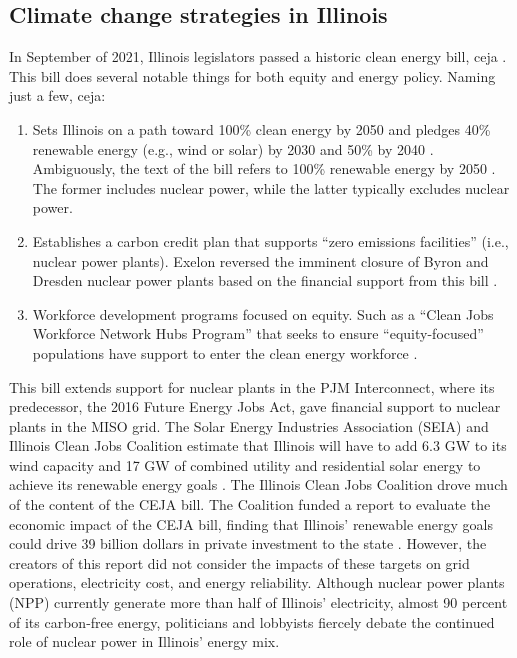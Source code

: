 \subsection{Climate change strategies in Illinois}
\label{section:ceja}
In September of 2021, Illinois legislators passed a historic clean energy bill,
\gls{ceja} \cite{harmon_climate_2021}. This bill does several notable things for
both equity and energy policy. Naming just a few, \gls{ceja}:
\begin{enumerate}
  \item Sets Illinois on a path toward 100\% clean energy by 2050 and pledges 40\% renewable
  energy (e.g., wind or solar) by 2030 and 50\% by 2040
  \cite{office_of_governor_jb_pritzker_gov_2021}. Ambiguously,
  the text of the bill refers to 100\% renewable energy by 2050 \cite{harmon_climate_2021}.
  The former includes nuclear power, while the latter typically excludes nuclear power.
  \item Establishes a carbon credit plan that supports “zero emissions facilities”
  (i.e., nuclear power plants). Exelon reversed the imminent closure of Byron and
  Dresden nuclear power plants based on the financial support from this bill
  \cite{brown_two_2021}.
  \item Workforce development programs focused on equity. Such as a
  “Clean Jobs Workforce Network Hubs Program” that seeks to ensure “equity-focused”
  populations have support to enter the clean energy workforce
  \cite{office_of_governor_jb_pritzker_gov_2021}.
\end{enumerate}
This bill extends support for nuclear plants in the PJM Interconnect, where its
predecessor, the 2016 Future Energy Jobs Act, gave financial support to nuclear
plants in the MISO grid. The Solar Energy Industries Association (SEIA) and Illinois
Clean Jobs Coalition estimate that Illinois will have to add 6.3 GW to its wind capacity
and 17 GW of combined utility and residential solar energy
to achieve its renewable energy goals \cite{goeller_new_2021, the_accelerate_group_clean_2019}.
The Illinois Clean Jobs Coalition drove much of the content of the CEJA bill.
The Coalition funded a report to evaluate the economic impact of the CEJA bill,
finding that Illinois’ renewable energy goals could drive 39 billion dollars in
private investment to the state \cite{the_accelerate_group_clean_2019}.
However, the creators of this report did not consider the impacts of these targets
on grid operations, electricity cost, and energy reliability. Although nuclear power
plants (NPP) currently generate more than half of Illinois’ electricity, almost
90 percent of its carbon-free energy, politicians and lobbyists fiercely debate the continued
role of nuclear power in Illinois’ energy mix.

